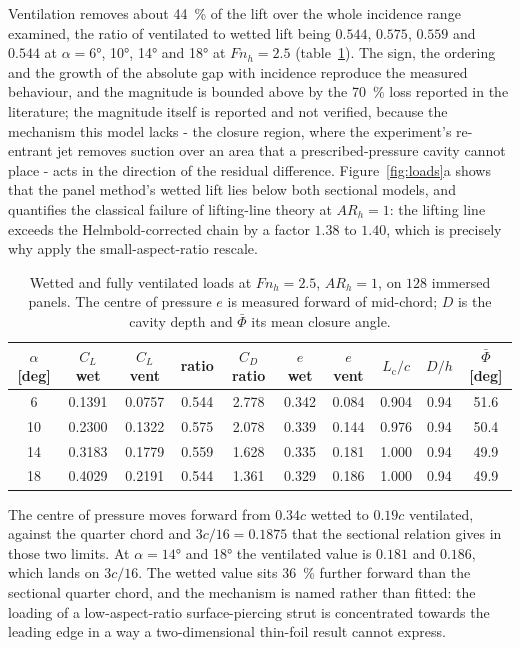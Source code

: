 \documentclass[11pt,a4paper]{article}
\newcommand{\Fnh}{\mathit{Fn}_h}
\newcommand{\ARh}{\mathit{AR}_h}
\begin{document}
Ventilation removes about \SI{44}{\percent} of the lift over the whole incidence
range examined, the ratio of ventilated to wetted lift being
$0.544$, $0.575$, $0.559$ and $0.544$ at $\alpha = \ang{6}$, \ang{10},
\ang{14} and \ang{18} at $\Fnh = 2.5$ (table~\ref{tab:loads}). The sign, the
ordering and the growth of the absolute gap with incidence reproduce the measured
behaviour, and the magnitude is bounded above by the \SI{70}{\percent} loss
reported in the literature; the magnitude itself is reported and not verified,
because the mechanism this model lacks - the closure region, where the
experiment's re-entrant jet removes suction over an area that a prescribed-pressure
cavity cannot place - acts in the direction of the residual difference.
Figure~\ref{fig:loads}a shows that the panel method's wetted lift lies below both
sectional models, and quantifies the classical failure of lifting-line theory at
$\ARh = 1$: the lifting line exceeds the Helmbold-corrected chain by a factor
$1.38$ to $1.40$, which is precisely why \citet{Harwood2016} apply the
small-aspect-ratio rescale.

\begin{table}[t]
  \centering
  \caption{Wetted and fully ventilated loads at $\Fnh = 2.5$, $\ARh = 1$, on
    $128$ immersed panels. The centre of pressure $e$ is measured forward of
    mid-chord; $D$ is the cavity depth and $\bar{\Phi}$ its mean closure angle.}
  \label{tab:loads}
  \small
  \setlength{\tabcolsep}{4pt}
  \begin{tabular}{cccccccccc}
    \toprule
    $\alpha$ [deg] & $C_L$ wet & $C_L$ vent & ratio
      & $C_D$ ratio & $e$ wet & $e$ vent
      & $L_{\mathrm{c}}/c$ & $D/h$ & $\bar{\Phi}$ [deg] \\
    \midrule
     6 & 0.1391 & 0.0757 & 0.544 & 2.778 & 0.342 & 0.084 & 0.904 & 0.94 & 51.6 \\
    10 & 0.2300 & 0.1322 & 0.575 & 2.078 & 0.339 & 0.144 & 0.976 & 0.94 & 50.4 \\
    14 & 0.3183 & 0.1779 & 0.559 & 1.628 & 0.335 & 0.181 & 1.000 & 0.94 & 49.9 \\
    18 & 0.4029 & 0.2191 & 0.544 & 1.361 & 0.329 & 0.186 & 1.000 & 0.94 & 49.9 \\
    \bottomrule
  \end{tabular}
\end{table}

The centre of pressure moves forward from $0.34c$ wetted to $0.19c$ ventilated,
against the quarter chord and $3c/16 = 0.1875$ that the sectional relation gives
in those two limits. At $\alpha = \ang{14}$ and \ang{18} the ventilated value is
$0.181$ and $0.186$, which lands on $3c/16$. The wetted value sits
\SI{36}{\percent} further forward than the sectional quarter chord, and the
mechanism is named rather than fitted: the loading of a low-aspect-ratio
surface-piercing strut is concentrated towards the leading edge in a way a
two-dimensional thin-foil result cannot express.
\end{document}
